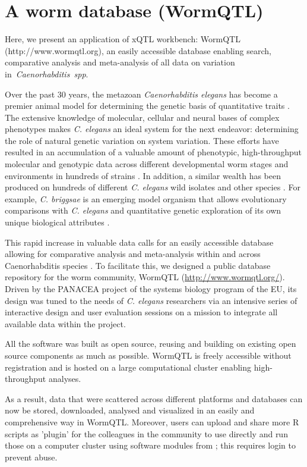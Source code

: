 \section{A worm database (WormQTL)}
Here, we present an application of xQTL workbench: WormQTL (http://www.wormqtl.org), an 
easily accessible database enabling search, comparative analysis and meta-analysis of all 
data on variation in \emph{Caenorhabditis spp}. 

Over the past 30 years, the metazoan \emph{Caenorhabditis elegans} has become a premier animal model for 
determining the genetic basis of quantitative traits \cite{Gaertner:2010, Kammenga:2008}. The 
extensive knowledge of molecular, cellular and neural bases of complex phenotypes makes 
\emph{C. elegans} an ideal system for the next endeavor: determining the role of natural genetic 
variation on system variation. These efforts have resulted in an accumulation of a valuable amount 
of phenotypic, high-throughput molecular and genotypic data across different developmental worm 
stages and environments in hundreds of strains \cite{Palopoli:2008, Kammenga:2007, Rockman:2010, 
McGrath:2009, Reddy:2009, Doroszuk:2009, Li:2010, Gutteling:2007, Vinuela:2010}. In addition, a similar wealth has been 
produced on hundreds of different \emph{C. elegans} wild isolates and other species \cite{Andersen:2012}. 
For example, \emph{C. briggsae} is an emerging model organism that allows evolutionary comparisons 
with \emph{C. elegans} and quantitative genetic exploration of its own unique biological 
attributes \cite{Ross:2011}.

This rapid increase in valuable data calls for an easily accessible database allowing for 
comparative analysis and meta-analysis within and across Caenorhabditis species \cite{Swertz:2007}. To 
facilitate this, we designed a public database repository for the worm community, WormQTL 
(\url{http://www.wormqtl.org/}). Driven by the PANACEA project of the systems biology program of 
the EU, its design was tuned to the needs of \emph{C. elegans} researchers via an intensive 
series of interactive design and user evaluation sessions on a mission to integrate all 
available data within the project.

All the software was built as open source, reusing and building on existing open source components 
as much as possible. WormQTL is freely accessible without registration and is hosted on a large 
computational cluster enabling high-throughput analyses.

As a result, data that were scattered across different platforms and databases can now be 
stored, downloaded, analysed and visualized in an easily and comprehensive way in WormQTL. 
Moreover, users can upload and share more R scripts as 'plugin' for the colleagues in the 
community to use directly and run those on a computer cluster using software modules from 
\xqtlwb \cite{Arends:2012, Snoek:2012}; this requires login to prevent abuse.

